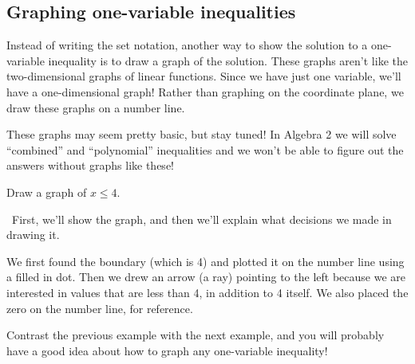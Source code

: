 \subsection{Graphing one-variable inequalities}

Instead of writing the set notation, another way to show the solution to a one-variable inequality is to draw a graph of the solution. These graphs aren't like the two-dimensional graphs of linear functions. Since we have just one variable, we'll have a one-dimensional graph! Rather than graphing on the coordinate plane, we draw these graphs on a number line.

These graphs may seem pretty basic, but stay tuned! In Algebra 2 we will solve ``combined'' and ``polynomial'' inequalities and we won't be able to figure out the answers without graphs like these!

\begin{boxex}
Draw a graph of $x \leq 4$.

\exsoln\ First, we'll show the graph, and then we'll explain what decisions we made in drawing it.

\begin{center}
\end{center}

We first found the boundary (which is 4) and plotted it on the number line using a filled in dot. Then we drew an arrow (a ray) pointing to the left because we are interested in values that are less than 4, in addition to 4 itself. We also placed the zero on the number line, for reference.
\end{boxex}

Contrast the previous example with the next example, and you will probably have a good idea about how to graph any one-variable inequality!

